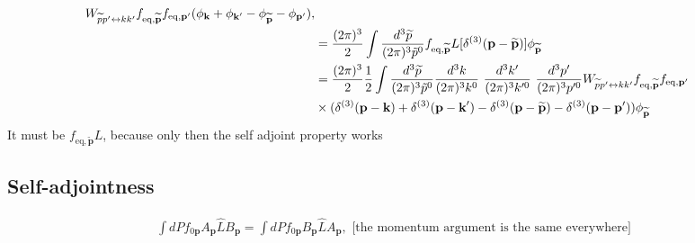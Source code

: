 \documentclass[aps,prd,preprint,nofootinbib,amsmath,amssymb,showpacs,longbibliography,singlecolumn,superscriptaddress,10pt]{revtex4-1}
\theoremstyle{plain}
\theoremstyle{definition}
\begin{document}
\begin{equation}
\begin{aligned}
W_{\widetilde{p}p' \leftrightarrow kk'} 
f_{\mathrm{eq},\widetilde{\textbf{p}}}
f_{\mathrm{eq},\textbf{p}'} (  \phi_{\textbf{k}} + \phi_{\textbf{k}'} - \phi_{\widetilde{\textbf{p}}} - \phi_{\textbf{p}'}  ),
\\
&
=
\frac{(2 \pi)^{3}}{2}  \int \frac{d^{3}\widetilde{p}}{(2 \pi)^{3}\Tilde{p}^{0}} f_{\mathrm{eq},\widetilde{\textbf{p}}}
L[\delta^{(3)}(\textbf{p} - \widetilde{\textbf{p}}) ] \phi_{\widetilde{\textbf{p}}}
\\
&
=
\frac{(2 \pi)^{3}}{2} 
\frac{1}{2} \int \frac{d^{3}\widetilde{p}}{(2 \pi)^{3}\Tilde{p}^{0}} 
\frac{d^{3}k}{(2 \pi)^{3} k^{0}} \ \frac{d^{3}k'}{(2 \pi)^{3} k'^{0}} \ \frac{d^{3}p'}{(2 \pi)^{3} p'^{0}}
W_{\widetilde{p}p' \leftrightarrow kk'} f_{\mathrm{eq},\widetilde{\textbf{p}}} f_{\mathrm{eq},\textbf{p}'} 
\\
&
\times (  \delta^{(3)}(\textbf{p} - \textbf{k}) + \delta^{(3)}(\textbf{p} - \textbf{k}') - \delta^{(3)}(\textbf{p} - \widetilde{\textbf{p}}) - \delta^{(3)}(\textbf{p} - \textbf{p}')  )  \phi_{\widetilde{\textbf{p}}}
\end{aligned}    
\end{equation}
%
It must be $f_{\mathrm{eq},\widetilde{\textbf{p}}}
L$, because only then the self adjoint property works 

\subsection{Self-adjointness}


%
\begin{equation}
\label{eq:selfadjoint}
\begin{aligned}
\int dP f_{0\mathbf{p}} A_{\mathbf{p}}  \hat{L}B_{\mathbf{p}} = \int dP f_{0\mathbf{p}} B_{\mathbf{p}} \hat{L}A_{\mathbf{p}}, \text{  
[the momentum argument is the same everywhere]}
\end{aligned}
\end{equation}
%
\end{document}
